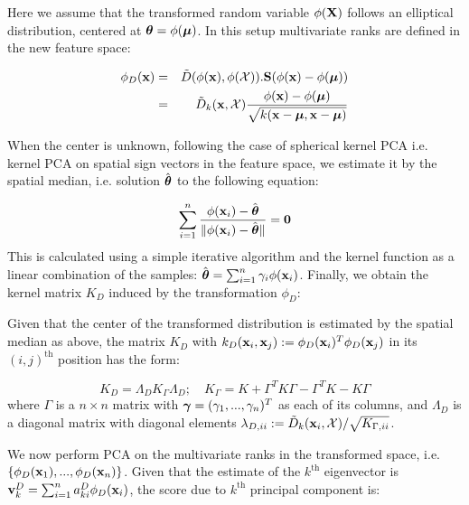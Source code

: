 \documentclass[10pt, conference, compsocconf]{IEEEtran}
\begin{document}
Here we assume that the transformed random variable $\phi({\mathbf{X}})$ follows an elliptical distribution, centered at ${\boldsymbol{\theta}} = \phi({\boldsymbol{\mu}})$. In this setup multivariate ranks are defined in the new feature space:

\begin{eqnarray}
\phi_D({\bf{x}}) &=& \tilde D( \phi({\bf{x}}), \phi(\mathcal X)). {\mathbf{S}}( \phi({\bf{x}}) - \phi({\boldsymbol{\mu}}))\nonumber\\
&=& \tilde D_k( {\bf{x}}, \mathcal X) \frac{\phi({\bf{x}}) - \phi({\boldsymbol{\mu}})}{\sqrt{k({\bf{x}} - {\boldsymbol{\mu}}, {\bf{x}} - {\boldsymbol{\mu}})}}
\end{eqnarray}

When the center is unknown, following the case of spherical kernel PCA \cite{DeBruyne10} i.e. kernel PCA on spatial sign vectors in the feature space, we estimate it by the spatial median, i.e. solution $\hat {{\boldsymbol{\theta}}}$ to the following equation:

\begin{equation}
\sum_{i=1}^n \frac{\phi({\bf{x}}_i) - \hat {{\boldsymbol{\theta}}}}{\| \phi({\bf{x}}_i) - \hat {{\boldsymbol{\theta}}} \|} = {\bf 0}
\end{equation}
This is calculated using a simple iterative algorithm and the kernel function as a linear combination of the samples: $\hat{{\boldsymbol{\theta}}} = \sum_{i=1}^n \gamma_i \phi({\bf{x}}_i)$. Finally, we obtain the kernel matrix $K_D$ induced by the transformation $\phi_D$:

\begin{theorem}\label{thm:thm1}
Given that the center of the transformed distribution is estimated by the spatial median as above, the matrix $K_D$ with $k_D( {\bf{x}}_i, {\bf{x}}_j) := \phi_D({\bf{x}}_i)^T \phi_D({\bf{x}}_j)$ in its $(i,j)^\text{th}$ position has the form:

\begin{equation}\label{eqn:thm1Eqn}
K_D = \Lambda_D K_\Gamma \Lambda_D; \quad K_\Gamma = K + \Gamma^T K \Gamma - \Gamma^T K - K \Gamma
\end{equation}
where $\Gamma$ is a $n \times n$ matrix with ${\boldsymbol{\gamma}} = (\gamma_1,...,\gamma_n)^T$ as each of its columns, and $\Lambda_D$ is a diagonal matrix with diagonal elements $\lambda_{D,ii} := \tilde D_k({\bf{x}}_i, \mathcal X)/ \sqrt{K_{\Gamma,ii}}$.
\end{theorem}

We now perform PCA on the multivariate ranks in the transformed space, i.e. $\{ \phi_D({\bf{x}}_1), ... , \phi_D({\bf{x}}_n) \}$. Given that the estimate of the $k^\text{th}$ eigenvector is ${\bf{v}}^D_k = \sum_{i=1}^n a^D_{ki} \phi_D({\bf{x}}_i)$, the score due to $k^\text{th}$ principal component is:
\end{document}
